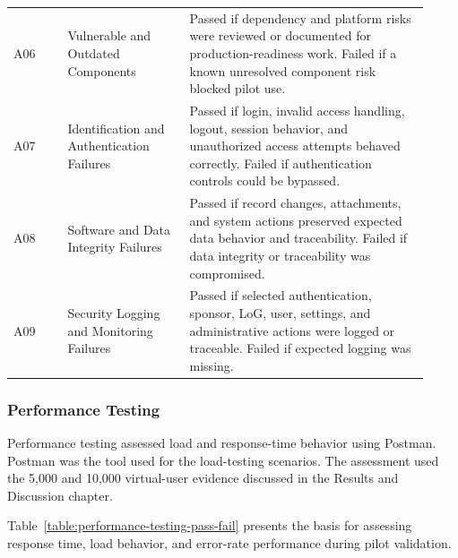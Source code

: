 \begin{longtable}{>{\raggedright\arraybackslash}p{0.12\linewidth}
>{\raggedright\arraybackslash}p{0.27\linewidth}
>{\raggedright\arraybackslash}p{0.53\linewidth}}
A06 & Vulnerable and Outdated Components & Passed if dependency and platform risks were reviewed or documented for production-readiness work. Failed if a known unresolved component risk blocked pilot use. \\
A07 & Identification and Authentication Failures & Passed if login, invalid access handling, logout, session behavior, and unauthorized access attempts behaved correctly. Failed if authentication controls could be bypassed. \\
A08 & Software and Data Integrity Failures & Passed if record changes, attachments, and system actions preserved expected data behavior and traceability. Failed if data integrity or traceability was compromised. \\
A09 & Security Logging and Monitoring Failures & Passed if selected authentication, sponsor, LoG, user, settings, and administrative actions were logged or traceable. Failed if expected logging was missing. \\
\end{longtable}

\subsubsection{Performance Testing}

Performance testing assessed load and response-time behavior using Postman. Postman was the tool used for the load-testing scenarios. The assessment used the 5,000 and 10,000 virtual-user evidence discussed in the Results and Discussion chapter.

\setlength{\LTleft}{0pt}
\setlength{\LTright}{\fill}
Table~\ref{table:performance-testing-pass-fail} presents the basis for assessing response time, load behavior, and error-rate performance during pilot validation.


